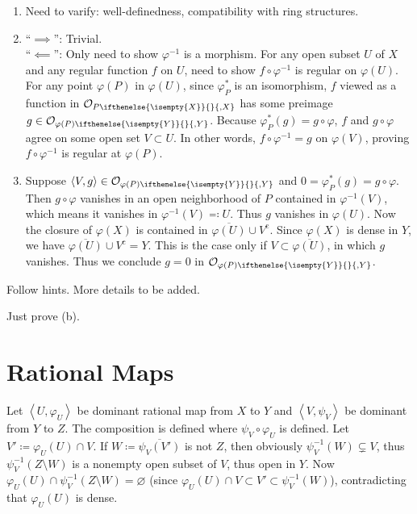 \documentclass{note}
\newcommand{\lring}[2][]{\mathcal{O}_{#2\ifthenelse{\isempty{#1}}{}{,#1}}}
\newcommand{\union}{\cup}
\newcommand{\closure}{\overline}
\newcommand{\cmpl}[1]{#1^\text{c}}
\newcommand{\chevrons}[1]{\left\langle#1\right\rangle}
\newcommand{\rational}[2]{\chevrons{#1,#2}}
\begin{document}
\setcounter{exercise}{2}
\Ex
\begin{enumerate}
  \item Need to varify: well-definedness, compatibility with ring
        structures.
  \item ``$\implies$'': Trivial.\\ ``$\impliedby$'': Only need to
        show $\varphi^{-1}$ is a morphism. For any open subset $U$ of $X$ and any
        regular function $f$ on $U$, need to show $f\circ\varphi^{-1}$ is regular on
        $\varphi(U)$. For any point $\varphi(P)$ in $\varphi(U)$, since $\varphi_P^*$
        is an isomorphism, $f$ viewed as a function in $\lring[X]{P}$ has some preimage
        $g\in\lring[Y]{\varphi(P)}$. Because $\varphi_P^*(g) = g\circ\varphi$, $f$ and
        $g\circ\varphi$ agree on some open set $V\subset U$. In other words,
        $f\circ\varphi^{-1} = g$ on $\varphi(V)$, proving $f\circ\varphi^{-1}$ is
        regular at $\varphi(P)$.
  \item Suppose $\chevrons{V,g}\in\lring[Y]{\varphi(P)}$
        and $0 = \varphi_P^*(g) = g\circ\varphi$. Then $g\circ\varphi$ vanishes in an
        open neighborhood of $P$ contained in $\varphi^{-1}(V)$, which means it
        vanishes in $\varphi^{-1}(V)\eqqcolon U$. Thus $g$ vanishes in $\varphi(U)$.
        Now the closure of $\varphi(X)$ is contained in
        $\closure{\varphi(U)}\union\cmpl{V}$. Since $\varphi(X)$ is dense in $Y$, we
        have $\closure{\varphi(U)}\union\cmpl{V} = Y$. This is the case only if
        $V\subset\closure{\varphi(U)}$, in which $g$ vanishes. Thus we conclude $g = 0$
        in $\lring[Y]{\varphi(P)}$.
\end{enumerate}

\setcounter{exercise}{4}
\Ex
Follow hints. More details to be added.

\setcounter{exercise}{6}
\Ex
Just prove (b).

\section{Rational Maps}
Let $\rational{U}{\varphi_U}$ be dominant rational map from $X$ to $Y$ and
$\rational{V}{\psi_V}$ be dominant from $Y$ to $Z$. The composition is defined
where $\psi_V\circ\varphi_U$ is defined. Let $V'\coloneqq\varphi_U(U)\cap V$.
If $W\coloneqq\closure{\psi_V(V')}$ is not $Z$, then obviously $\psi_V^{-1}(W)
  \subsetneq V$, thus $\psi_V^{-1}(Z\setminus W)$ is a nonempty open subset of
$V$, thus open in $Y$. Now $\varphi_U(U) \cap \psi_V^{-1}(Z\setminus W) =
  \varnothing$ (since $\varphi_U(U) \cap V \subset V' \subset \psi_V^{-1}(W)$),
contradicting that $\varphi_U(U)$ is dense.
\end{document}

